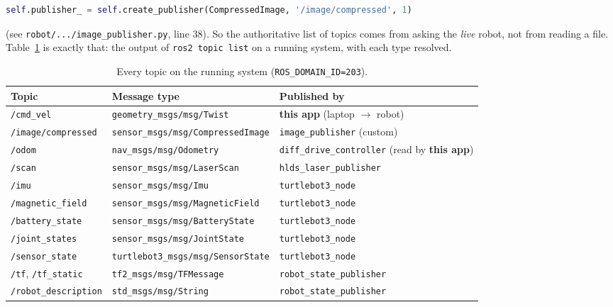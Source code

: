 \documentclass[11pt,a4paper]{article}
\newcommand{\code}[1]{\texttt{#1}}
\begin{document}
\begin{lstlisting}[language=Python]
self.publisher_ = self.create_publisher(CompressedImage, '/image/compressed', 1)
\end{lstlisting}

\noindent
(see \code{robot/.../image\_publisher.py}, line 38). So the authoritative list
of topics comes from asking the \emph{live} robot, not from reading a file.
Table~\ref{tab:topics} is exactly that: the output of \code{ros2 topic list} on
a running system, with each type resolved.

\begin{table}[h]
\centering
\small
\begin{tabular}{@{}lll@{}}
\toprule
\textbf{Topic} & \textbf{Message type} & \textbf{Published by} \\
\midrule
\code{/cmd\_vel}          & \code{geometry\_msgs/msg/Twist}        & \textbf{this app} (laptop $\to$ robot) \\
\code{/image/compressed}  & \code{sensor\_msgs/msg/CompressedImage}& \code{image\_publisher} (custom) \\
\code{/odom}              & \code{nav\_msgs/msg/Odometry}          & \code{diff\_drive\_controller} (read by \textbf{this app}) \\
\code{/scan}              & \code{sensor\_msgs/msg/LaserScan}      & \code{hlds\_laser\_publisher} \\
\code{/imu}               & \code{sensor\_msgs/msg/Imu}            & \code{turtlebot3\_node} \\
\code{/magnetic\_field}   & \code{sensor\_msgs/msg/MagneticField}  & \code{turtlebot3\_node} \\
\code{/battery\_state}    & \code{sensor\_msgs/msg/BatteryState}   & \code{turtlebot3\_node} \\
\code{/joint\_states}     & \code{sensor\_msgs/msg/JointState}     & \code{turtlebot3\_node} \\
\code{/sensor\_state}     & \code{turtlebot3\_msgs/msg/SensorState}& \code{turtlebot3\_node} \\
\code{/tf}, \code{/tf\_static} & \code{tf2\_msgs/msg/TFMessage}    & \code{robot\_state\_publisher} \\
\code{/robot\_description}& \code{std\_msgs/msg/String}            & \code{robot\_state\_publisher} \\
\bottomrule
\end{tabular}
\caption{Every topic on the running system (\code{ROS\_DOMAIN\_ID=203}).}
\label{tab:topics}
\end{table}
\end{document}
